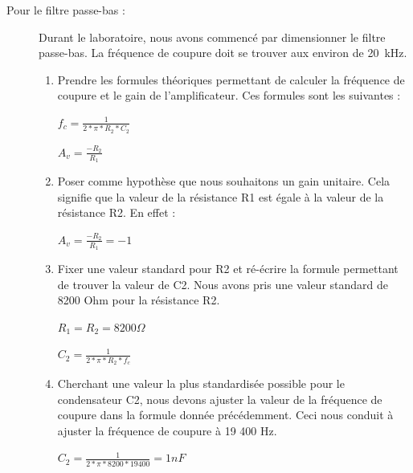 \documentclass[10pt, oneside, a4paper]{article}
\begin{document}
\begin{description}
\item[Pour le filtre passe-bas :] Durant le laboratoire, nous avons commencé par dimensionner le filtre passe-bas. La fréquence de coupure doit se trouver aux environ de \SI{20}{\kilo\hertz}.
    \begin{enumerate}
        \item Prendre les formules théoriques permettant de calculer la fréquence de coupure et le gain de l'amplificateur. Ces formules sont les suivantes : 
            \begin{center} $f_{c}=\frac{1}{2*\pi*R_{2}*C_{2}}$ \end{center} 
            \begin{center} $A_{v}=\frac{-R_{2}}{R_{1}}$ \end{center} 
        \item Poser comme hypothèse que nous souhaitons un gain unitaire. Cela signifie que la valeur de la résistance R1 est égale à la valeur de la résistance R2. En effet : \begin{center} $A_{v}=\frac{-R_{2}}{R_{1}} = -1$ \end{center} 
        \item Fixer une valeur standard pour R2 et ré-écrire la formule permettant de trouver la valeur de C2. Nous avons pris une valeur standard de 8200 Ohm pour la résistance R2.
            \begin{center} $R_{1}= R_{2} = 8 200\Omega $ \end{center}
            \begin{center} $C_{2}=\frac{1}{2*\pi*R_{2}*f_{c}}$ \end{center} 
        \item Cherchant une valeur la plus standardisée possible pour le condensateur C2, nous devons ajuster la valeur de la fréquence de coupure dans la formule donnée précédemment. Ceci nous conduit à ajuster la fréquence de coupure à 19 400 Hz.
            \begin{center} $C_{2}=\frac{1}{2*\pi*8 200*19 400}= 1 nF$ \end{center} 
    \end{enumerate}
\end{description}
\end{document}
